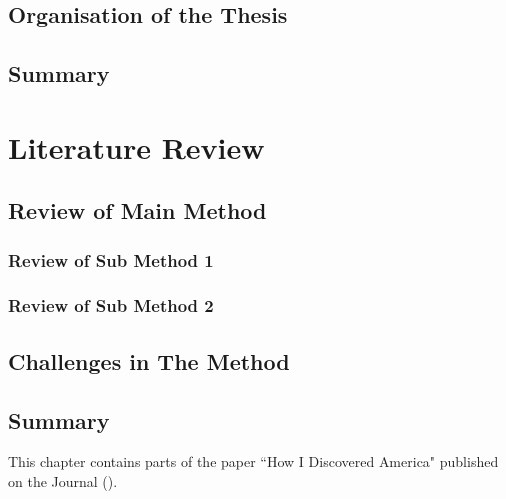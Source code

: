 \documentclass[11pt,a4paper,openright]{book}
\newcommand{\blankpage}{\newpage This page intentionally left blank.}
\theoremstyle{plain}
\theoremstyle{definition}
\begin{document}
\section{Organisation of the Thesis}
\lipsum[7]


\section{Summary}
\lipsum[4]

\chapter{Literature Review}\label{ch-lit-rev}
\lipsum[1]

\section{Review of Main Method}
\lipsum[2-3]
\cite{gree00,jame76}

\subsection{Review of Sub Method 1}
\lipsum[3-6]
\cite{phil99,smit54}
 
\subsection{Review of Sub Method 2}
\lipsum[5-9]



\section{Challenges in The Method}
\lipsum[3-7]




\section{Summary}

\lipsum[1-2]




\begin{savequote}[0.75\linewidth]
	This chapter contains parts of the paper ``How {I} Discovered {America}" published on the Journal (\cite{colu92}).
	\qauthor{} 
\end{savequote}
\end{document}
